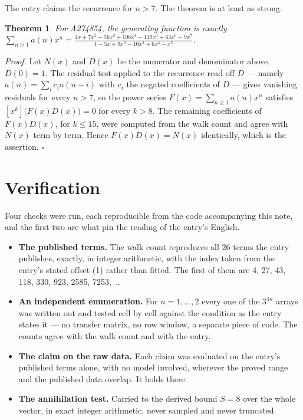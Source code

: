 \documentclass[11pt]{article}
\newtheorem{theorem}{Theorem}
\theoremstyle{definition}
\begin{document}
The entry claims the recurrence for $n > 7$. The theorem is at least as strong.

\begin{theorem} For A274854, the generating function is exactly $\sum_{n\ge 1} a(n)x^n = \frac{4x + 7x^{2} - 56x^{3} + 106x^{4} - 119x^{5} + 63x^{6} - 9x^{7}}{1 - 5x + 9x^{2} - 10x^{3} + 6x^{4} - x^{5}}$.\end{theorem}

{\itshape Proof.} Let $N(x)$ and $D(x)$ be the numerator and denominator above, $D(0)=1$. The residual test applied to the recurrence read off $D$ --- namely $a(n) = \sum_i c_i a(n-i)$ with $c_i$ the negated coefficients of $D$ --- gives vanishing residuals for every $n > 7$, so the power series $F(x)=\sum_{n\ge 1}a(n)x^n$ satisfies $[x^k]\bigl(F(x)D(x)\bigr) = 0$ for every $k > 8$. The remaining coefficients of $F(x)D(x)$, for $k \le 15$, were computed from the walk count and agree with $N(x)$ term by term. Hence $F(x)D(x) = N(x)$ identically, which is the assertion. $\square$

\section{Verification}

Four checks were run, each reproducible from the code accompanying this note, and the first two are what pin the reading of the entry's English.

\begin{itemize}

\item {\bfseries The published terms.} The walk count reproduces all 26 terms the entry publishes, exactly, in integer arithmetic, with the index taken from the entry's stated offset (1) rather than fitted. The first of them are 4, 27, 43, 118, 330, 923, 2585, 7253,~\dots

\item {\bfseries An independent enumeration.} For $n = 1,\dots,2$ every one of the $3^{4n}$ arrays was written out and tested cell by cell against the condition as the entry states it --- no transfer matrix, no row window, a separate piece of code. The counts agree with the walk count and with the entry.

\item {\bfseries The claim on the raw data.} Each claim was evaluated on the entry's published terms alone, with no model involved, wherever the proved range and the published data overlap. It holds there.

\item {\bfseries The annihilation test.} Carried to the derived bound $S = 8$ over the whole vector, in exact integer arithmetic, never sampled and never truncated.

\end{itemize}
\end{document}
